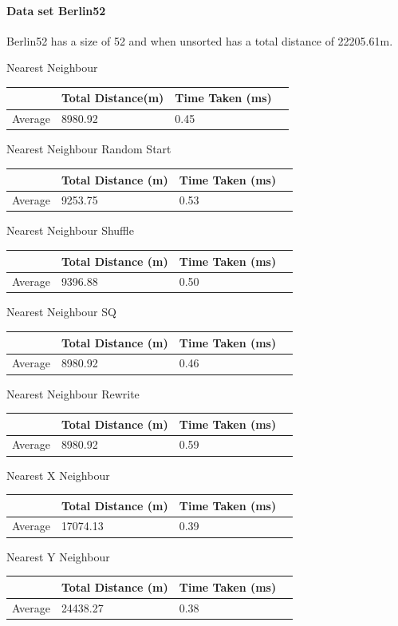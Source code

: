 \documentclass[conference,backref=page]{acmsiggraph}
\begin{document}
\paragraph{Data set Berlin52} \hfill

Berlin52 has a size of 52 and when unsorted has a total distance of 22205.61m.

\begin{center}	
	
	Nearest Neighbour
	\begin{tabular}{| l | l | l | l |}
		\hline
		& Total Distance(m)& Time Taken (ms)\\ \hline
		Average & 8980.92 & 0.45 \\ \hline
	\end{tabular}
	
	Nearest Neighbour Random Start
	\begin{tabular}{| l | l | l | l |}
		\hline
		& Total Distance (m) & Time Taken (ms)\\ \hline
		Average & 9253.75 & 0.53 \\ \hline
	\end{tabular}
	
	Nearest Neighbour Shuffle
	\begin{tabular}{| l | l | l | l |}
		\hline
		& Total Distance (m) & Time Taken (ms)\\ \hline
		Average & 9396.88 & 0.50 \\ \hline
	\end{tabular}
	
	Nearest Neighbour SQ
	\begin{tabular}{| l | l | l | l |}
		\hline
		& Total Distance (m) & Time Taken (ms)\\ \hline
		Average & 8980.92 & 0.46 \\ \hline
	\end{tabular}
	
	Nearest Neighbour Rewrite
	\begin{tabular}{| l | l | l | l |}
		\hline
		& Total Distance (m) & Time Taken (ms)\\ \hline
		Average & 8980.92 & 0.59 \\ \hline
	\end{tabular}
	
	
	Nearest X Neighbour	
	\begin{tabular}{| l | l | l | l |}
		\hline
		& Total Distance (m) & Time Taken (ms)\\ \hline
		Average & 17074.13 & 0.39 \\ \hline	
	\end{tabular}
	
	Nearest Y Neighbour	
	\begin{tabular}{| l | l | l | l |}
		\hline
		& Total Distance (m) & Time Taken (ms)\\ \hline
		Average & 24438.27 & 0.38 \\ \hline
	\end{tabular}
\end{center}
\end{document}

